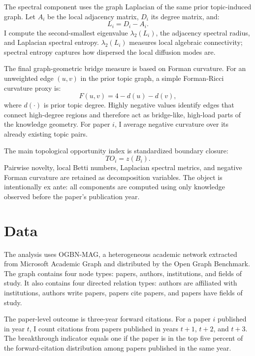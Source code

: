 \documentclass[preprint,12pt,authoryear]{elsarticle}
\begin{document}
The spectral component uses the graph Laplacian of the same prior topic-induced graph. Let $A_i$ be the local adjacency matrix, $D_i$ its degree matrix, and:
\begin{equation}
L_i = D_i - A_i.
\end{equation}
I compute the second-smallest eigenvalue $\lambda_2(L_i)$, the adjacency spectral radius, and Laplacian spectral entropy. $\lambda_2(L_i)$ measures local algebraic connectivity; spectral entropy captures how dispersed the local diffusion modes are.

The final graph-geometric bridge measure is based on Forman curvature. For an unweighted edge $(u,v)$ in the prior topic graph, a simple Forman-Ricci curvature proxy is:
\begin{equation}
F(u,v) = 4 - d(u) - d(v),
\end{equation}
where $d(\cdot)$ is prior topic degree. Highly negative values identify edges that connect high-degree regions and therefore act as bridge-like, high-load parts of the knowledge geometry. For paper $i$, I average negative curvature over its already existing topic pairs.

The main topological opportunity index is standardized boundary closure:
\begin{equation}
TO_i = z(B_i).
\end{equation}
Pairwise novelty, local Betti numbers, Laplacian spectral metrics, and negative Forman curvature are retained as decomposition variables. The object is intentionally ex ante: all components are computed using only knowledge observed before the paper's publication year.

\section{Data}

The analysis uses OGBN-MAG, a heterogeneous academic network extracted from Microsoft Academic Graph and distributed by the Open Graph Benchmark. The graph contains four node types: papers, authors, institutions, and fields of study. It also contains four directed relation types: authors are affiliated with institutions, authors write papers, papers cite papers, and papers have fields of study.



The paper-level outcome is three-year forward citations. For a paper $i$ published in year $t$, I count citations from papers published in years $t+1$, $t+2$, and $t+3$. The breakthrough indicator equals one if the paper is in the top five percent of the forward-citation distribution among papers published in the same year.
\end{document}
